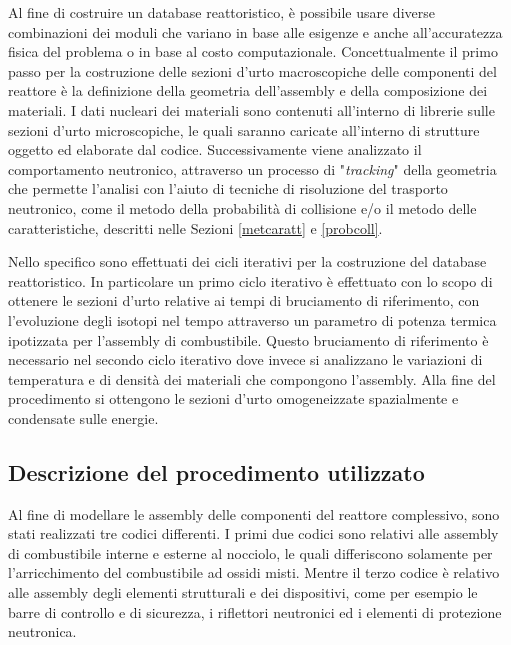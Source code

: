 Al fine di costruire un database reattoristico, è possibile usare diverse 
combinazioni dei moduli che variano in base alle esigenze e anche 
all'accuratezza fisica del problema o in base al costo computazionale.
Concettualmente il primo passo per la costruzione delle sezioni d'urto 
macroscopiche delle componenti del reattore è la definizione della 
geometria dell'assembly e della composizione dei materiali.
I dati nucleari dei materiali sono contenuti all'interno di librerie sulle sezioni 
d'urto microscopiche, le quali saranno caricate all'interno di strutture 
oggetto 
ed elaborate dal codice.
Successivamente viene analizzato il comportamento neutronico, attraverso un 
processo di "\textit{tracking}" della geometria che permette l'analisi con l'aiuto di 
tecniche di risoluzione del 
trasporto neutronico, come il metodo della probabilità di collisione e/o il 
metodo 
delle caratteristiche, descritti nelle Sezioni \ref{metcaratt} e \ref{probcoll}.

Nello specifico sono effettuati dei cicli iterativi per la costruzione del 
database reattoristico. 
In particolare un primo ciclo iterativo è effettuato con lo scopo di ottenere 
le 
sezioni d'urto relative ai tempi di bruciamento di riferimento, con 
l'evoluzione degli 
isotopi nel tempo attraverso un parametro di potenza termica ipotizzata per 
l'assembly di combustibile. 
Questo bruciamento di riferimento è necessario nel secondo ciclo iterativo dove 
invece si analizzano le variazioni di temperatura e di densità dei materiali 
che 
compongono l'assembly.
Alla fine del procedimento si ottengono le sezioni d'urto omogeneizzate 
spazialmente e condensate sulle energie. 

\subsection{Descrizione del procedimento utilizzato}

Al fine di modellare le assembly delle componenti del reattore complessivo, 
sono stati realizzati tre codici differenti.
I primi due codici sono relativi alle assembly di 
combustibile interne e esterne al nocciolo, le quali differiscono solamente per l'arricchimento del 
combustibile ad ossidi misti. Mentre il terzo codice è relativo alle assembly degli elementi strutturali e dei dispositivi, come per esempio le barre di controllo e di sicurezza, i riflettori neutronici ed i elementi di 
protezione neutronica.

